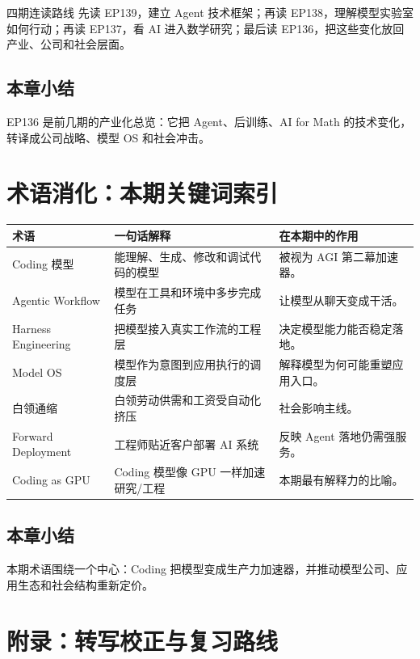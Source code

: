 \documentclass[a4paper]{article}
\begin{document}
\begin{knowledgebox}{四期连读路线}
先读 EP139，建立 Agent 技术框架；再读 EP138，理解模型实验室如何行动；再读 EP137，看 AI 进入数学研究；最后读 EP136，把这些变化放回产业、公司和社会层面。
\end{knowledgebox}

\subsection{本章小结}

EP136 是前几期的产业化总览：它把 Agent、后训练、AI for Math 的技术变化，转译成公司战略、模型 OS 和社会冲击。

\section{术语消化：本期关键词索引}

\begin{longtable}{p{}p{}p{}}
\toprule
术语 & 一句话解释 & 在本期中的作用 \\
\midrule
Coding 模型 & 能理解、生成、修改和调试代码的模型 & 被视为 AGI 第二幕加速器。 \\
Agentic Workflow & 模型在工具和环境中多步完成任务 & 让模型从聊天变成干活。 \\
Harness Engineering & 把模型接入真实工作流的工程层 & 决定模型能力能否稳定落地。 \\
Model OS & 模型作为意图到应用执行的调度层 & 解释模型为何可能重塑应用入口。 \\
白领通缩 & 白领劳动供需和工资受自动化挤压 & 社会影响主线。 \\
Forward Deployment & 工程师贴近客户部署 AI 系统 & 反映 Agent 落地仍需强服务。 \\
Coding as GPU & Coding 模型像 GPU 一样加速研究/工程 & 本期最有解释力的比喻。 \\
\bottomrule
\end{longtable}

\subsection{本章小结}

本期术语围绕一个中心：Coding 把模型变成生产力加速器，并推动模型公司、应用生态和社会结构重新定价。


\section{附录：转写校正与复习路线}
\end{document}
